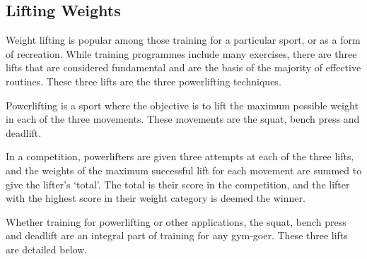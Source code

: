 \subsection{Lifting Weights}

Weight lifting is popular among those training for a particular sport, or as a form of recreation. While training programmes include many exercises, there are three lifts that are considered fundamental and are the basis of the majority of effective routines. These three lifts are the three powerlifting techniques.

Powerlifting is a sport where the objective is to lift the maximum possible weight in each of the three movements. These movements are the squat, bench press and deadlift.

In a competition, powerlifters are given three attempts at each of the three lifts, and the weights of the maximum successful lift for each movement are summed to give the lifter’s `total'. The total is their score in the competition, and the lifter with the highest score in their weight category is deemed the winner.

Whether training for powerlifting or other applications, the squat, bench press and deadlift are an integral part of training for any gym-goer. These three lifts are detailed below.





